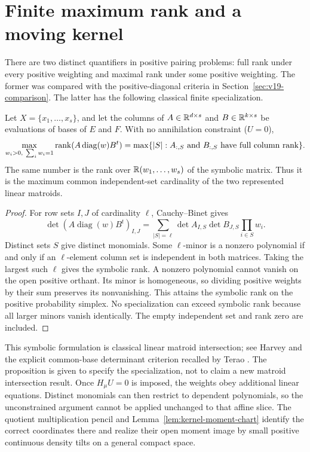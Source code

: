 \section{Finite maximum rank and a moving kernel}
\label{sec:finite-pairing-comparison}
There are two distinct quantifiers in positive pairing problems: full
rank under every positive weighting and maximal rank under some positive
weighting. The former was compared with the positive-diagonal criteria
in Section~\ref{sec:v19-comparison}. The latter has the following
classical finite specialization.

\begin{proposition}
\label{prop:finite-matroid-rank}
Let $X=\{x_1,\ldots,x_s\}$, and let the columns of
$A\in\mathbb R^{d\times s}$ and $B\in\mathbb R^{k\times s}$ be evaluations of
bases of $E$ and $F$. With no annihilation constraint ($U=0$),
\begin{equation}\label{eq:finite-matroid-rank}
 \max_{w_i>0,\ \sum_iw_i=1}\operatorname{rank}(A\operatorname{diag}(w)B^t)
 =\max\{|S|: A_{:,S}\text{ and }B_{:,S}\text{ have full column rank}\}.
\end{equation}
The same number is the rank over $\mathbb R(w_1,\ldots,w_s)$ of the symbolic
matrix. Thus it is the maximum common independent-set cardinality of
the two represented linear matroids.
\end{proposition}
\begin{proof}
For row sets $I,J$ of cardinality $\ell$, Cauchy--Binet gives
\[
 \det(A\operatorname{diag}(w)B^t)_{I,J}
 =\sum_{|S|=\ell}\det A_{I,S}\det B_{J,S}\prod_{i\in S}w_i.
\]
Distinct sets $S$ give distinct monomials. Some $\ell$-minor is a
nonzero polynomial if and only if an $\ell$-element column set is
independent in both matrices. Taking the largest such $\ell$ gives
the symbolic rank. A nonzero polynomial cannot vanish on the open
positive orthant. Its minor is homogeneous, so dividing positive
weights by their sum preserves its nonvanishing. This attains the
symbolic rank on the positive probability simplex. No specialization
can exceed symbolic rank because all larger minors vanish identically.
The empty independent set and rank zero are included.
\end{proof}

This symbolic formulation is classical linear matroid intersection; see
Harvey \cite{Harvey2009} and the explicit common-base determinant
criterion recalled by Terao \cite[p.~39:2]{Terao2026}. The proposition
is given to specify the specialization, not to claim a new matroid
intersection result. Once $H_\mu U=0$ is imposed, the weights obey
additional linear equations. Distinct monomials can then restrict to
dependent polynomials, so the unconstrained argument cannot be applied
unchanged to that affine slice. The quotient multiplication pencil and
Lemma~\ref{lem:kernel-moment-chart} identify the correct coordinates
there and realize their open moment image by small positive continuous
density tilts on a general compact space.

